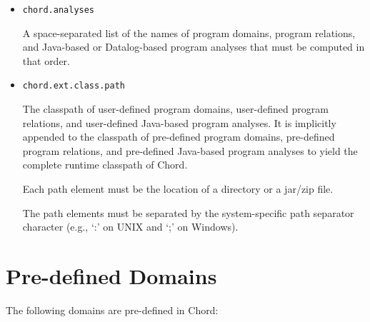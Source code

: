 \documentclass{article}
\providecommand\Chord{{Chord}}
\begin{document}
\begin{itemize}
\item
{\tt chord.analyses}

A space-separated list of the names of program domains, program relations, and
Java-based or Datalog-based program analyses that must be computed in that order.

\item
{\tt chord.ext.class.path}

The classpath of user-defined program domains, user-defined program relations,
and user-defined Java-based program analyses.
It is implicitly appended to the classpath of pre-defined program domains,
pre-defined program relations, and pre-defined Java-based program analyses
to yield the complete runtime classpath of \Chord.

Each path element must be the location of a directory or a jar/zip file.

The path elements must be separated by the system-specific path separator character
(e.g., `:' on UNIX and `;' on Windows).
\end{itemize}

\texonly{\newpage}
\section{Pre-defined Domains}
\label{sec-predef-domains}

The following domains are pre-defined in \Chord:
\end{document}
